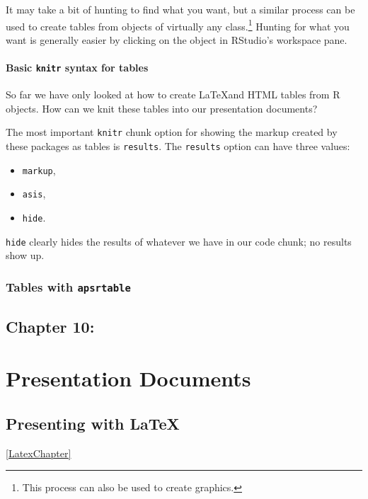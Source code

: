 \documentclass[ChapterTOCs,krantz1]{krantz}\usepackage{graphicx, color}
\begin{document}
It may take a bit of hunting to find what you want, but a similar process can be used to create tables from objects of virtually any class.\footnote{This process can also be used to create graphics.} Hunting for what you want is generally easier by clicking on the object in RStudio's workspace pane.

\subsection{Basic \texttt{knitr} syntax for tables}

So far we have only looked at how to create \LaTeX and HTML tables from R objects. How can we knit these tables into our presentation documents?

The most important \texttt{knitr} chunk option for showing the markup created by these packages as tables is \texttt{results}. The \texttt{results} option can have three values:

\begin{itemize}
\item
  \texttt{markup},
\item
  \texttt{asis},
\item
  \texttt{hide}.
\end{itemize}
\texttt{hide} clearly hides the results of whatever we have in our code chunk; no results show up.

\section{Tables with \texttt{apsrtable}}






\chapter{Chapter 10:}


\part{Presentation Documents}





\chapter{Presenting with \LaTeX}\ref{LatexChapter}
\end{document}
